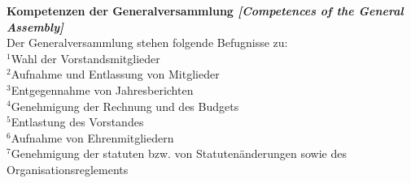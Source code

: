 \documentclass[10pt]{article}
\newcounter{qcounter}
\renewcommand{\section}[1]{\pagebreak[3]%
    \vspace{1.3\baselineskip}%
    \phantomsection\addcontentsline{toc}{section}{#1}%
    \noindent\llap{\scshape\smash{\parbox[t]{\marginparwidth}{\hyphenpenalty=10000\raggedright #1}}}%
    \vspace{-\baselineskip}\par}
\begin{document}
\begin{list}{{\bf Artikel :~}}{}
\item {\bf Kompetenzen der Generalversammlung {\it[Competences of the General Assembly]}}\\
Der Generalversammlung stehen folgende Befugnisse zu:\\
$^{1}$Wahl der Vorstandsmitglieder\\
$^{2}$Aufnahme und Entlassung von Mitglieder\\
$^{3}$Entgegennahme von Jahresberichten\\
$^{4}$Genehmigung der Rechnung und des Budgets\\
$^{5}$Entlastung des Vorstandes\\
$^{6}$Aufnahme von Ehrenmitgliedern\\
$^{7}$Genehmigung der statuten bzw. von Statuten\"anderungen sowie des Organisationsreglements\\


 



\end{list}
\end{document}
